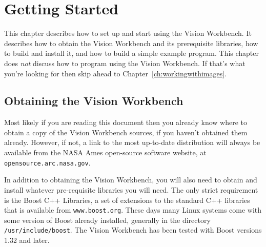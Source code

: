 \chapter{Getting Started}\label{ch:gettingstarted}

This chapter describes how to set up and start using the Vision
Workbench.  It describes how to obtain the Vision Workbench and its
prerequisite libraries, how to build and install it, and how to build
a simple example program.  This chapter does {\it not} discuss how to
program using the Vision Workbench.  If that's what you're looking for
then skip ahead to Chapter~\ref{ch:workingwithimages}.

\section{Obtaining the Vision Workbench}

Most likely if you are reading this document then you already know 
where to obtain a copy of the Vision Workbench sources, if you haven't 
obtained them already.  However, if not, a link to the most up-to-date 
distribution will always be available from the NASA Ames open-source 
software website, at \verb#opensource.arc.nasa.gov#.

In addition to obtaining the Vision Workbench, you will also need to
obtain and install whatever pre-requisite libraries you will need.
The only strict requirement is the Boost C++ Libraries, a set of
extensions to the standard C++ libraries that is available from
\verb#www.boost.org#.  These days many Linux systems come with some
version of Boost already installed, generally in the directory
\verb#/usr/include/boost#.  The Vision Workbench has been tested with
Boost versions 1.32 and later.

